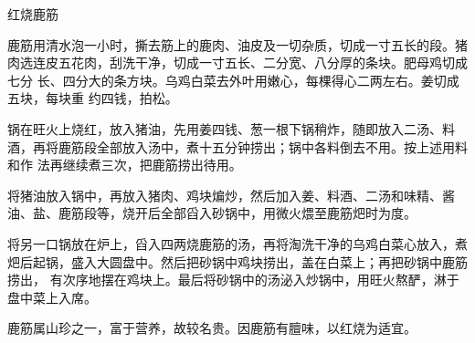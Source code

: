 \begin{recipe}{红烧鹿筋}

\ingredients


\preparation

\step 鹿筋用清水泡一小时，撕去筋上的鹿肉、油皮及一切杂质，切成一寸五长的段。猪
肉选连皮五花肉，刮洗干净，切成一寸五长、二分宽、八分厚的条块。肥母鸡切成七分
长、四分大的条方块。乌鸡白菜去外叶用嫩心，每棵得心二两左右。姜切成五块，每块重
约四钱，拍松。

\step 锅在旺火上烧红，放入猪油，先用姜四钱、葱一根下锅稍炸，随即放入二汤、料
酒，再将鹿筋段全部放入汤中，煮十五分钟捞出；锅中各料倒去不用。按上述用料和作
法再继续煮三次，把鹿筋捞出待用。

\step 将猪油放入锅中，再放入猪肉、鸡块煸炒，然后加入姜、料酒、二汤和味精、酱
油、盐、鹿筋段等，烧开后全部舀入砂锅中，用微火煨至鹿筋𤆵时为度。

\step 将另一口锅放在炉上，舀入四两烧鹿筋的汤，再将淘洗干净的乌鸡白菜心放入，煮
𤆵后起锅，盛入大圆盘中。然后把砂锅中鸡块捞出，盖在白菜上；再把砂锅中鹿筋捞出，
有次序地摆在鸡块上。最后将砂锅中的汤泌入炒锅中，用旺火熬酽，淋于盘中菜上入席。

\features

鹿筋属山珍之一，富于营养，故较名贵。因鹿筋有膻味，以红烧为适宜。

\end{recipe}

